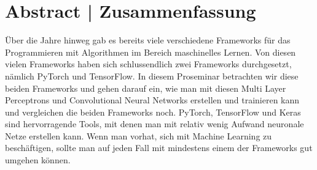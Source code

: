 \section*{Abstract | Zusammenfassung}
Über die Jahre hinweg gab es bereits viele verschiedene Frameworks für das Programmieren 
mit Algorithmen im Bereich maschinelles Lernen. Von diesen vielen Frameworks 
haben sich schlussendlich zwei Frameworks durchgesetzt, nämlich PyTorch und TensorFlow. 
In diesem Proseminar betrachten wir diese beiden Frameworks und gehen darauf ein, 
wie man mit diesen Multi Layer Perceptrons und Convolutional Neural Networks 
erstellen und trainieren kann und vergleichen die beiden Frameworks noch.
PyTorch, TensorFlow und Keras sind hervorragende Tools, mit denen man mit 
relativ wenig Aufwand neuronale Netze erstellen kann. Wenn man vorhat, sich 
mit Machine Learning zu beschäftigen, sollte man auf jeden Fall mit mindestens einem der 
Frameworks gut umgehen können.